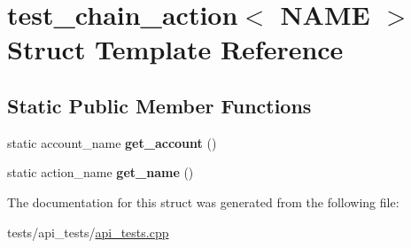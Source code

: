 \hypertarget{structtest__chain__action}{}\section{test\+\_\+chain\+\_\+action$<$ N\+A\+ME $>$ Struct Template Reference}
\label{structtest__chain__action}
\subsection*{Static Public Member Functions}
\begin{DoxyCompactItemize}
\item 
\mbox{\label{structtest__chain__action_ae19b15defbe37401b050951f67d9de06}} 
static account\+\_\+name {\bfseries get\+\_\+account} ()
\item 
\mbox{\label{structtest__chain__action_acc97a2ed80eac76ec4c08471971a1227}} 
static action\+\_\+name {\bfseries get\+\_\+name} ()
\end{DoxyCompactItemize}


The documentation for this struct was generated from the following file\+:\begin{DoxyCompactItemize}
\item 
tests/api\+\_\+tests/\mbox{\hyperlink{api__tests_8cpp}{api\+\_\+tests.\+cpp}}\end{DoxyCompactItemize}
